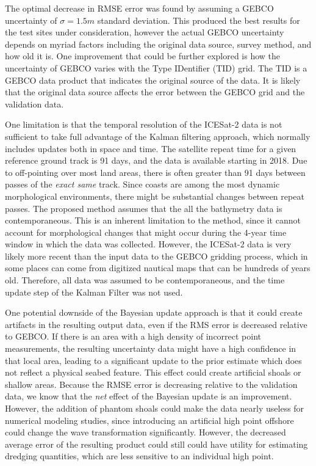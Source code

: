The optimal decrease in RMSE error was found by assuming a GEBCO uncertainty of $\sigma=1.5m$ standard deviation. This produced the best results for the test sites under consideration, however the actual GEBCO uncertainty depends on myriad factors including the original data source, survey method, and how old it is. One improvement that could be further explored is how the uncertainty of GEBCO varies with the Type IDentifier (TID) grid. The TID is a GEBCO data product that indicates the original source of the data. It is likely that the original data source affects the error between the GEBCO grid and the validation data.

One limitation is that the temporal resolution of the ICESat-2 data is not sufficient to take full advantage of the Kalman filtering approach, which normally includes updates both in space and time. The satellite repeat time for a given reference ground track is 91 days, and the data is available starting in 2018. Due to off-pointing over most land areas, there is often greater than 91 days between passes of the \emph{exact same} track. Since coasts are among the most dynamic morphological environments, there might be substantial changes between repeat passes. The proposed method assumes that the all the bathymetry data is contemporaneous. This is an inherent limitation to the method, since it cannot account for morphological changes that might occur during the 4-year time window in which the data was collected. However, the ICESat-2 data is very likely more recent than the input data to the GEBCO gridding process, which in some places can come from digitized nautical maps that can be hundreds of years old. Therefore, all data was assumed to be contemporaneous, and the time update step of the Kalman Filter was not used.


One potential downside of the Bayesian update approach is that it could create artifacts in the resulting output data, even if the RMS error is decreased relative to GEBCO. If there is an area with a high density of incorrect point measurements, the resulting uncertainty data might have a high confidence in that local area, leading to a significant update to the prior estimate which does not reflect a physical seabed  feature. This effect could create artificial shoals or shallow areas.  Because the RMSE error is decreasing relative to the validation data, we know that the \emph{net} effect of the Bayesian update is an improvement. However, the addition of phantom shoals could make the data nearly useless for numerical modeling studies, since introducing an artificial high point offshore could change the wave transformation significantly. However, the decreased average error of the resulting product could still could have utility for estimating dredging quantities, which are less sensitive to an individual high point. 